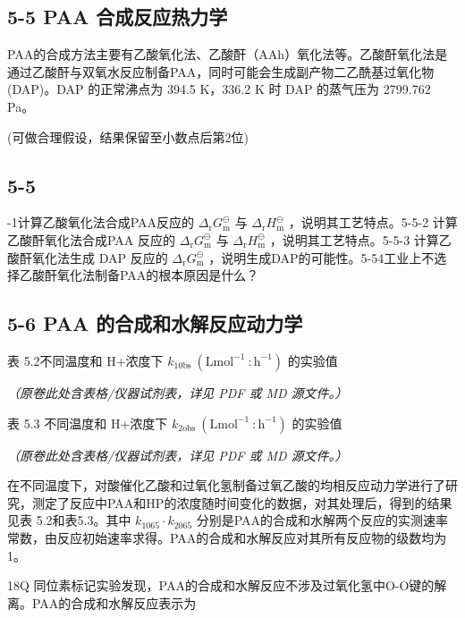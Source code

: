 \subsection*{5-5 PAA 合成反应热力学}

PAA的合成方法主要有乙酸氧化法、乙酸酐（AAh）氧化法等。乙酸酐氧化法是通过乙酸酐与双氧水反应制备PAA，同时可能会生成副产物二乙酰基过氧化物(DAP)。DAP 的正常沸点为 394.5 K，336.2 K 时 DAP 的蒸气压为 2799.762 Pa。

(可做合理假设，结果保留至小数点后第2位)

\subsection*{5-5}
-1计算乙酸氧化法合成PAA反应的 $\Delta _ { \mathrm { r } } G _ { \mathrm { m } } ^ { \ominus }$ 与 $\Delta _ { \mathrm { r } } H _ { \mathrm { m } } ^ { \ominus }$ ，说明其工艺特点。5-5-2 计算乙酸酐氧化法合成PAA 反应的 $\Delta _ { \mathrm { r } } G _ { \mathrm { m } } ^ { \ominus }$ 与 $\Delta _ { \mathrm { r } } H _ { \mathrm { m } } ^ { \ominus }$ ，说明其工艺特点。5-5-3 计算乙酸酐氧化法生成 DAP 反应的 $\Delta _ { \mathrm { r } } G _ { \mathrm { m } } ^ { \ominus }$ ，说明生成DAP的可能性。5-54工业上不选择乙酸酐氧化法制备PAA的根本原因是什么？

\subsection*{5-6 PAA 的合成和水解反应动力学}

表 5.2不同温度和 H+浓度下 $k _ { 1 0 \mathrm { b s } } ~ ( \mathrm { L } \mathrm { m o l ^ { - 1 } \ : h ^ { - 1 } } )$ 的实验值

\textit{（原卷此处含表格/仪器试剂表，详见 PDF 或 MD 源文件。）}

表 5.3 不同温度和 H+浓度下 $k _ { 2 \mathrm { o b s } } ~ ( \mathrm { L } \mathrm { m o l ^ { - 1 } \ : h ^ { - 1 } } )$ 的实验值

\textit{（原卷此处含表格/仪器试剂表，详见 PDF 或 MD 源文件。）}

在不同温度下，对酸催化乙酸和过氧化氢制备过氧乙酸的均相反应动力学进行了研究，测定了反应中PAA和HP的浓度随时间变化的数据，对其处理后，得到的结果见表 5.2和表5.3。其中 $k _ { 1 0 6 5 } \cdot k _ { 2 0 6 5 }$ 分别是PAA的合成和水解两个反应的实测速率常数，由反应初始速率求得。PAA的合成和水解反应对其所有反应物的级数均为1。

18Q 同位素标记实验发现，PAA的合成和水解反应不涉及过氧化氢中O-O键的解离。PAA的合成和水解反应表示为

